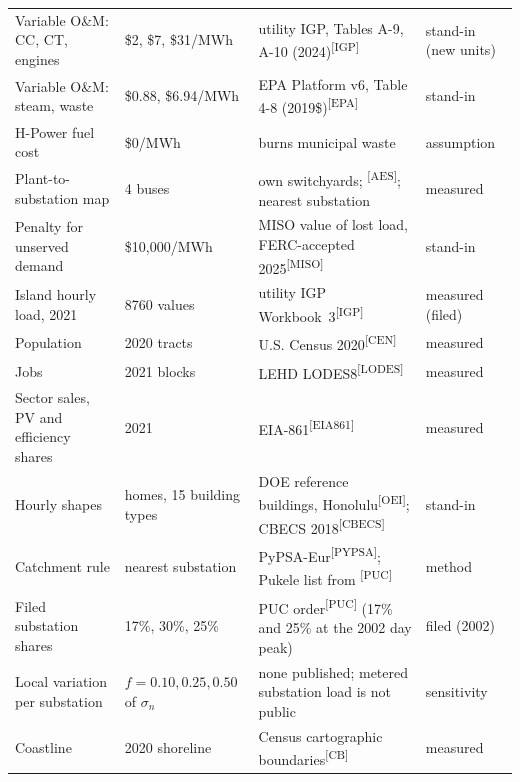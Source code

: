 \documentclass[11pt,a4paper]{article}
\newcommand{\src}[1]{\textsuperscript{[#1]}}
\begin{document}
\begin{small}
\begin{longtable}{@{}p{}p{}p{}p{}@{}}
Variable O\&M: CC, CT, engines & \$2, \$7, \$31/MWh & utility IGP, Tables A-9, A-10 (2024)\src{IGP} & stand-in (new units) \\
Variable O\&M: steam, waste & \$0.88, \$6.94/MWh & EPA Platform v6, Table 4-8 (2019\$)\src{EPA} & stand-in \\
H-Power fuel cost & \$0/MWh & burns municipal waste & assumption \\
Plant-to-substation map & 4 buses & own switchyards; \src{AES}; nearest substation & measured \\
Penalty for unserved demand & \$10{,}000/MWh & MISO value of lost load, FERC-accepted 2025\src{MISO} & stand-in \\
Island hourly load, 2021 & \num{8760} values & utility IGP Workbook~3\src{IGP} & measured (filed) \\
Population & 2020 tracts & U.S. Census 2020\src{CEN} & measured \\
Jobs & 2021 blocks & LEHD LODES8\src{LODES} & measured \\
Sector sales, PV and efficiency shares & 2021 & EIA-861\src{EIA861} & measured \\
Hourly shapes & homes, 15 building types & DOE reference buildings, Honolulu\src{OEI}; CBECS 2018\src{CBECS} & stand-in \\
Catchment rule & nearest substation & PyPSA-Eur\src{PYPSA}; Pukele list from \src{PUC} & method \\
Filed substation shares & 17\%, 30\%, 25\% & PUC order\src{PUC} (17\% and 25\% at the 2002 day peak) & filed (2002) \\
Local variation per substation & $f = 0.10, 0.25, 0.50$ of $\sigma_n$ & none published; metered substation load is not public & sensitivity \\
Coastline & 2020 shoreline & Census cartographic boundaries\src{CB} & measured \\
\bottomrule
\end{longtable}
\end{small}

\end{document}
